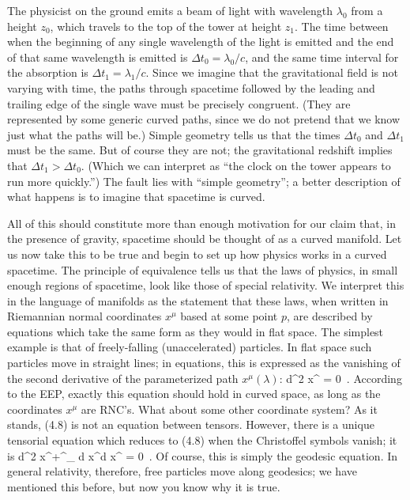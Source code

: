 The physicist on the ground emits a beam of light with wavelength
$\lambda_0$ from a height $z_0$, which travels to the top of the
tower at height $z_1$.  The time between when the beginning of any
single wavelength of the light is emitted and the end of that same 
wavelength is emitted is $\Delta t_0 = \lambda_0/c$, and the same time 
interval for the absorption is $\Delta t_1=\lambda_1/c$.  Since we imagine 
that the gravitational field is not varying with time, the paths through
spacetime followed by the leading and trailing edge of the single
wave must be precisely congruent.  (They are represented by some
generic curved paths, since we do not pretend that we know just what
the paths will be.)  Simple geometry tells us that the times
$\Delta t_0$ and $\Delta t_1$ must be the same.  But of course they
are not; the gravitational redshift implies that $\Delta t_1 >
\Delta t_0$.  (Which we can interpret as ``the clock on the tower
appears to run more quickly.'')  The fault lies with ``simple
geometry''; a better description of what happens is to imagine that
spacetime is curved.

All of this should constitute more than enough motivation for our
claim that, in the presence of gravity, spacetime should be thought
of as a curved manifold.  Let us now take this to be true and begin
to set up how physics works in a curved spacetime.  The principle
of equivalence tells us that the laws of physics, in small enough
regions of spacetime, look like those of special relativity.  We
interpret this in the language of manifolds as the statement that
these laws, when written in Riemannian normal coordinates $x^\mu$
based at some point $p$, are described by equations which take the
same form as they would in flat space.  The simplest example is
that of freely-falling (unaccelerated) particles.  In flat space
such particles move in straight lines; in equations, this is 
expressed as the vanishing of the second derivative of the parameterized
path $x^\mu(\lambda)$:
\be
  {{d^2 x^\mu}} = 0\ .\label{4.8}
\ee
According to the EEP, exactly this equation should hold in
curved space, as long as the coordinates $x^\mu$ are RNC's.  What
about some other coordinate system?  As it stands, (4.8) is
not an equation between tensors.  However, there is a unique 
tensorial equation which reduces to (4.8) when the Christoffel
symbols vanish; it is
\be
  {{d^2 x^\mu}}+\Gamma^\mu_{\rho\sigma}
  {{d x^\rho}}{{d x^\sigma}} = 0\ .
  \label{4.9}
\ee
Of course, this is simply the geodesic equation.  In general relativity,
therefore, free particles move along geodesics; we have mentioned this
before, but now you know why it is true.

